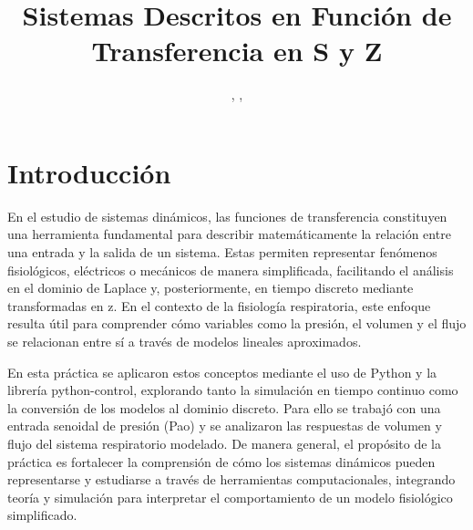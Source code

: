 \documentclass[journal]{IEEEtran}
\begin{document}

\title{Sistemas Descritos en Función de Transferencia en S y Z}


\author{%
    , ,
    \\%
    
}

\maketitle

\section{Introducción}

En el estudio de sistemas dinámicos, las funciones de transferencia constituyen una herramienta fundamental para describir matemáticamente la relación entre una entrada y la salida de un sistema. Estas permiten representar fenómenos fisiológicos, eléctricos o mecánicos de manera simplificada, facilitando el análisis en el dominio de Laplace y, posteriormente, en tiempo discreto mediante transformadas en z. En el contexto de la fisiología respiratoria, este enfoque resulta útil para comprender cómo variables como la presión, el volumen y el flujo se relacionan entre sí a través de modelos lineales aproximados.

En esta práctica se aplicaron estos conceptos mediante el uso de Python y la librería python-control, explorando tanto la simulación en tiempo continuo como la conversión de los modelos al dominio discreto. Para ello se trabajó con una entrada senoidal de presión (Pao) y se analizaron las respuestas de volumen y flujo del sistema respiratorio modelado. De manera general, el propósito de la práctica es fortalecer la comprensión de cómo los sistemas dinámicos pueden representarse y estudiarse a través de herramientas computacionales, integrando teoría y simulación para interpretar el comportamiento de un modelo fisiológico simplificado. 
\end{document}
